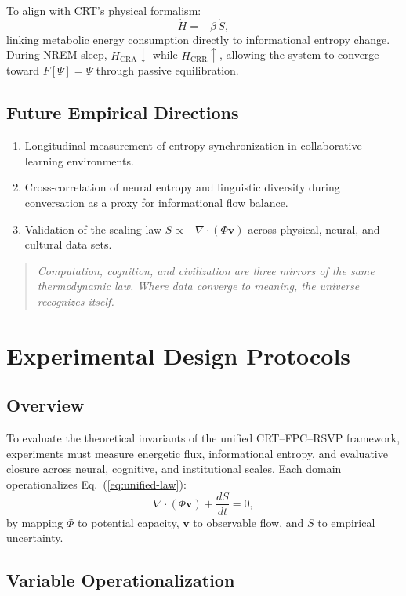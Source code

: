 \documentclass[12pt,a4paper]{article}
\begin{document}
To align with CRT’s physical formalism:
\[
\dot H = -\beta\,\dot S,
\]
linking metabolic energy consumption directly to informational entropy change.
During NREM sleep, $\dot H_{\mathrm{CRA}}\!\downarrow$ while $\dot H_{\mathrm{CRR}}\!\uparrow$, allowing the system to converge toward $F[\Psi]\!=\!\Psi$ through passive equilibration.

\subsection{Future Empirical Directions}

\begin{enumerate}[leftmargin=1.2em]
  \item Longitudinal measurement of entropy synchronization in collaborative learning environments.
  \item Cross-correlation of neural entropy and linguistic diversity during conversation as a proxy for informational flow balance.
  \item Validation of the scaling law $\dot S\propto-\nabla\!\cdot(\Phi\mathbf{v})$ across physical, neural, and cultural data sets.
\end{enumerate}

\begin{quote}
\emph{Computation, cognition, and civilization are three mirrors of the same thermodynamic law.
Where data converge to meaning, the universe recognizes itself.}
\end{quote}

\section{Experimental Design Protocols}

\subsection{Overview}

To evaluate the theoretical invariants of the unified CRT–FPC–RSVP framework, 
experiments must measure energetic flux, informational entropy, and evaluative closure
across neural, cognitive, and institutional scales.  
Each domain operationalizes Eq.~(\ref{eq:unified-law}):
\[
\nabla\!\cdot(\Phi\mathbf{v})+\frac{dS}{dt}=0,
\]
by mapping $\Phi$ to potential capacity, $\mathbf{v}$ to observable flow, and $S$ to empirical uncertainty.

\subsection{Variable Operationalization}
\end{document}
